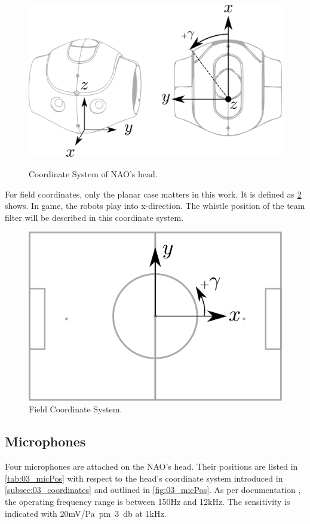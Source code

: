 \begin{figure}[ht]
      \centering
      \includegraphics[width=0.60\columnwidth]{figures/nao_coor_both}
      \label{fig:03_naoCoordinate}
      \caption{Coordinate System of NAO's head.}
\end{figure}

For field coordinates, only the planar case matters in this work.
It is defined as \cref{fig:03_fieldCoordinates} shows.
In game, the robots play into x-direction.
The whistle position of the team filter will be described
in this coordinate system.
\begin{figure}[ht]
      \centering
      \includegraphics[width=0.50\columnwidth]{figures/field}
      \caption{Field Coordinate System.}
      \label{fig:03_fieldCoordinates}
\end{figure}

\subsection{Microphones}
\label{subsec:03_microphones}

Four microphones are attached on the NAO's head.
Their positions are listed in \cref{tab:03_micPos} with respect
to the head's coordinate system introduced in \cref{subsec:03_coordinates}
\cite{v6_docu} and outlined in \cref{fig:03_micPos}.
As per documentation \cite{nao_docu}, the operating frequency range
is between 150\si{\hertz} and 12\si{\kilo\hertz}.
The sensitivity is indicated with 20\si{\milli\volt/\pascal\pm3\decibel} at
1\si{\kilo\hertz}.


